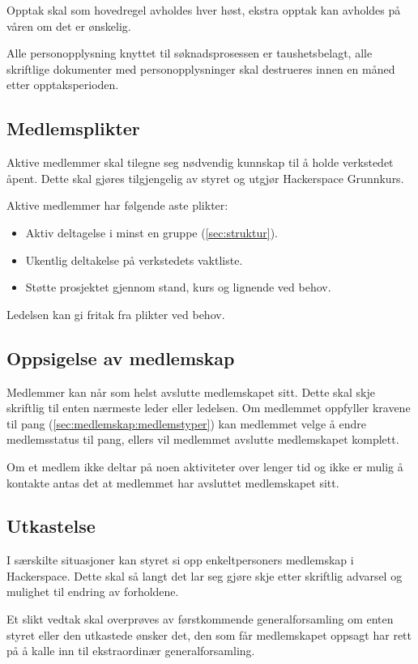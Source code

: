 Opptak skal som hovedregel avholdes hver høst, ekstra opptak kan avholdes på våren om det er ønskelig.

Alle personopplysning knyttet til søknadsprosessen er taushetsbelagt, alle skriftlige dokumenter med personopplysninger skal destrueres innen en måned etter opptaksperioden.

\subsection{Medlemsplikter}\label{sec:medlemskap:medlemsplikter}
Aktive medlemmer skal tilegne seg nødvendig kunnskap til å holde verkstedet åpent.
Dette skal gjøres tilgjengelig av styret og utgjør Hackerspace Grunnkurs.

Aktive medlemmer har følgende aste plikter:
\begin{itemize}
\item Aktiv deltagelse i minst en gruppe (\ref{sec:struktur}).
\item Ukentlig deltakelse på verkstedets vaktliste.
\item Støtte prosjektet gjennom stand, kurs og lignende ved behov.
\end{itemize}
Ledelsen kan gi fritak fra plikter ved behov.

\subsection{Oppsigelse av medlemskap}\label{sec:medlemskap:oppsigelse}
Medlemmer kan når som helst avslutte medlemskapet sitt.
Dette skal skje skriftlig til enten nærmeste leder eller ledelsen.
Om medlemmet oppfyller kravene til pang (\ref{sec:medlemskap:medlemstyper}) kan medlemmet velge å endre medlemsstatus til pang, ellers vil medlemmet avslutte medlemskapet komplett.

Om et medlem ikke deltar på noen aktiviteter over lenger tid og ikke er mulig å kontakte antas det at medlemmet har avsluttet medlemskapet sitt.

\subsection{Utkastelse}\label{sec:medlemskap:utkastelse}
I særskilte situasjoner kan styret si opp enkeltpersoners medlemskap i Hackerspace.
Dette skal så langt det lar seg gjøre skje etter skriftlig advarsel og mulighet til endring av forholdene.

Et slikt vedtak skal overprøves av førstkommende generalforsamling om enten styret eller den utkastede ønsker det, den som får medlemskapet oppsagt har rett på å kalle inn til ekstraordinær generalforsamling.


